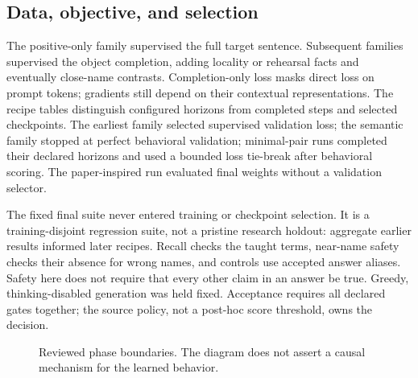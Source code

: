 \subsection{Data, objective, and selection}
The positive-only family supervised the full target sentence. Subsequent
families supervised the object completion, adding locality or rehearsal facts
and eventually close-name contrasts. Completion-only loss masks direct loss on
prompt tokens; gradients still depend on their contextual representations.
The recipe tables distinguish configured horizons from completed steps and
selected checkpoints. The earliest family selected supervised validation loss;
the semantic family stopped at perfect behavioral validation; minimal-pair
runs completed their declared horizons and used a bounded loss tie-break after
behavioral scoring. The paper-inspired run evaluated final weights without a
validation selector.\citep{trlsft,peftlora,retrospective}

The fixed final suite never entered training or checkpoint selection. It is a
training-disjoint regression suite, not a pristine research holdout: aggregate
earlier results informed later recipes. Recall checks the taught terms,
near-name safety checks their absence for wrong names, and controls use
accepted answer aliases. Safety here does not require that every other claim
in an answer be true. Greedy, thinking-disabled generation was held fixed.
Acceptance requires all declared gates together; the source policy, not a
post-hoc score threshold, owns the decision.\citep{retrospective,historicalmanifest}

\begin{figure}[htbp]
\centering
{}
\caption{Reviewed phase boundaries. The diagram does not assert a causal
mechanism for the learned behavior.\citep{retrospective}}
\end{figure}
